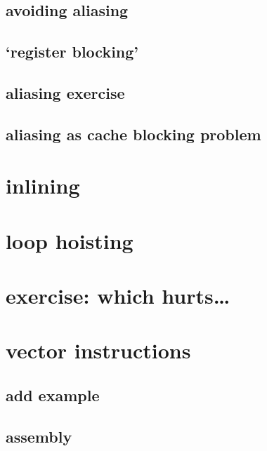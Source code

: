 \subsection{avoiding aliasing}

\subsection{`register blocking'}
 

\subsection{aliasing exercise}


\subsection{aliasing as cache blocking problem}





\section{inlining}



\section{loop hoisting}



\section{exercise: which hurts\ldots}


\section{vector instructions}


\subsection{add example}


\subsection{assembly}


